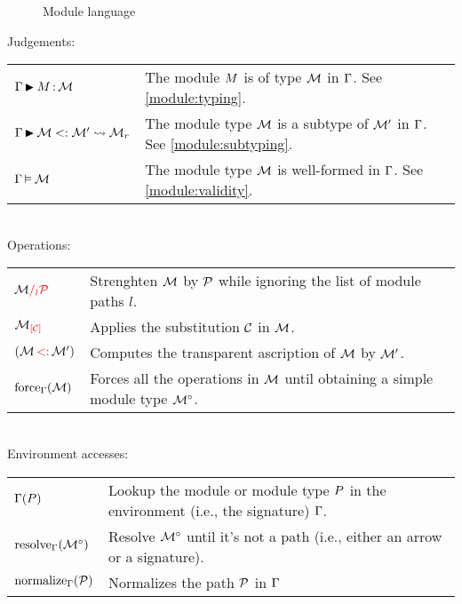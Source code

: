 \documentclass{article}
\theoremstyle{definition}
\begin{document}
\begin{figure}[!hb]
  
  \caption{Module language}
  \label{grammar}
\end{figure}

Judgements:\\
\begin{tabular}{ll}
  $\Gamma \operatorname{\blacktriangleright}_{} M \operatorname{:} \mathcal M$
  &The module $M$ is of type $\mathcal M$ in $\Gamma$.
  See \cref{module:typing}.\\

  $\Gamma \operatorname{\blacktriangleright}_{} \mathcal M <: \mathcal M' \leadsto \mathcal M_r$&
  The module type $\mathcal M$ is a subtype of $\mathcal M'$ in $\Gamma$.
  See \cref{module:subtyping}.\\

  $\Gamma \operatorname{\vDash}_{} \mathcal M$ &
  The module type $\mathcal M$ is well-formed in $\Gamma$.
  See \cref{module:validity}.
\end{tabular}\\

Operations:\\
\begin{tabular}{ll}
  $\mathcal M{\color{red}/_{l}\mathcal P}$
  & Strenghten $\mathcal M$ by $\mathcal P$ while ignoring the list of module paths $l$.\\
  ${\mathcal M}_{\color{red}\left[\mathcal C\right]}$
  & Applies the substitution $\mathcal C$ in $\mathcal M$.\\
  $(\mathcal M \operatorname{{\color{red}<:}} \mathcal M')$
  & Computes the transparent ascription of $\mathcal M$ by $\mathcal M'$.\\
  $\operatorname{force}_{\Gamma}(\mathcal M)$
  & Forces all the operations in $\mathcal M$ until obtaining a simple module type ${\mathcal M^\circ}$.
\end{tabular}\\

Environment accesses:\\
\begin{tabular}{ll}
  $\Gamma(P)$
  & Lookup the module or module type $P$ in the environment (i.e., the signature)
    $\Gamma$.\\
  $\operatorname{resolve}_{\Gamma}({\mathcal M^\circ})$
  & Resolve ${\mathcal M^\circ}$ until it's not a path (i.e., either an arrow or a signature).\\
  $\operatorname{normalize}_{\Gamma}(\mathcal P)$
  & Normalizes the path $\mathcal P$ in $\Gamma$
\end{tabular}

\begin{figure}[hbt]
  
\end{figure}


\begin{figure}[hbt]
  
\end{figure}
\end{document}

